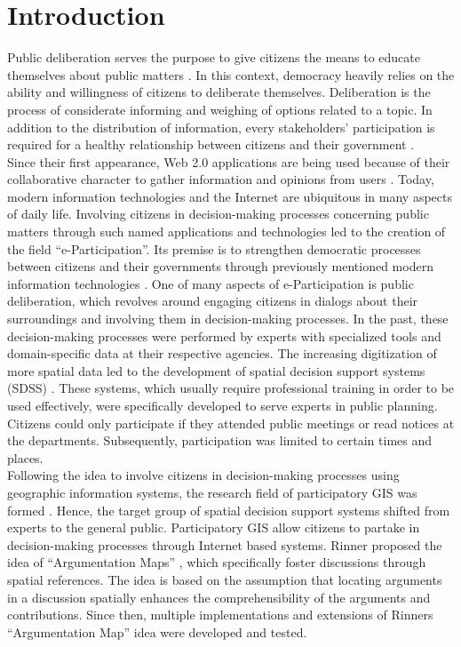 \section{Introduction}
\label{chap:introduction}
Public deliberation serves the purpose to give citizens the means to educate themselves about public matters \cite{page1996deliberates}. In this context, democracy heavily relies on the ability and willingness of citizens to deliberate themselves. Deliberation is the process of considerate informing and weighing of options related to a topic. In addition to the distribution of information, every stakeholders' participation is required for a healthy relationship between citizens and their government \cite{Arnstein1969_citizen_participation}.\\
Since their first appearance, Web 2.0 applications are being used because of their collaborative character to gather information and opinions from users \cite{o2007web}. Today, modern information technologies and the Internet are ubiquitous in many aspects of daily life. Involving citizens in decision-making processes concerning public matters through such named applications and technologies led to the creation of the field ``e-Participation''. Its premise is to strengthen democratic processes between citizens and their governments through previously mentioned modern information technologies \cite{Saebo_eParticipation, Medaglia2012_eParticipation}. One of many aspects of e-Participation is public deliberation, which revolves around engaging citizens in dialogs about their surroundings and involving them in decision-making processes. In the past, these decision-making processes were performed by experts with specialized tools and domain-specific data at their respective agencies. The increasing digitization of more spatial data led to the development of spatial decision support systems (SDSS) \cite{densham_sdss}. These systems, which usually require professional training in order to be used effectively, were specifically developed to serve experts in public planning. Citizens could only participate if they attended public meetings or read notices at the departments. Subsequently, participation was limited to certain times and places.\\
Following the idea to involve citizens in decision-making processes using geographic information systems, the research field of participatory GIS was formed \cite{Macintosh2004_eParticipation_characterization,Sieber2006_PublicParticipationGIS}. Hence, the target group of spatial decision support systems shifted from experts to the general public. Participatory GIS allow citizens to partake in decision-making processes through Internet based systems. Rinner proposed the idea of ``Argumentation Maps'' \cite{Rinner_ArgumentationMaps}, which specifically foster discussions through spatial references. The idea is based on the assumption that locating arguments in a discussion spatially enhances the comprehensibility of the arguments and contributions. Since then, multiple implementations and extensions of Rinners ``Argumentation Map'' idea were developed and tested.\\

